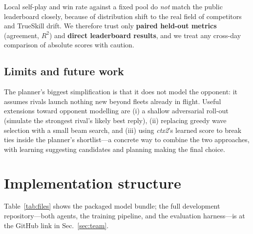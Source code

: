 \documentclass[conference]{IEEEtran}
\begin{document}
Local self-play and win rate against a fixed pool do \emph{not} match the public leaderboard closely, because of distribution shift to the real field of competitors and TrueSkill drift. We therefore trust only \textbf{paired held-out metrics} (agreement, $R^2$) and \textbf{direct leaderboard results}, and we treat any cross-day comparison of absolute scores with caution.

\subsection{Limits and future work}

The planner's biggest simplification is that it does not model the opponent: it assumes rivals launch nothing new beyond fleets already in flight. Useful extensions toward opponent modelling are (i) a shallow adversarial roll-out (simulate the strongest rival's likely best reply), (ii) replacing greedy wave selection with a small beam search, and (iii) using \textit{ctx2}'s learned score to break ties inside the planner's shortlist---a concrete way to combine the two approaches, with learning suggesting candidates and planning making the final choice.

\section{Implementation structure}

Table~\ref{tab:files} shows the packaged model bundle; the full development repository---both agents, the training pipeline, and the evaluation harness---is at the GitHub link in Sec.~\ref{sec:team}.
\end{document}
